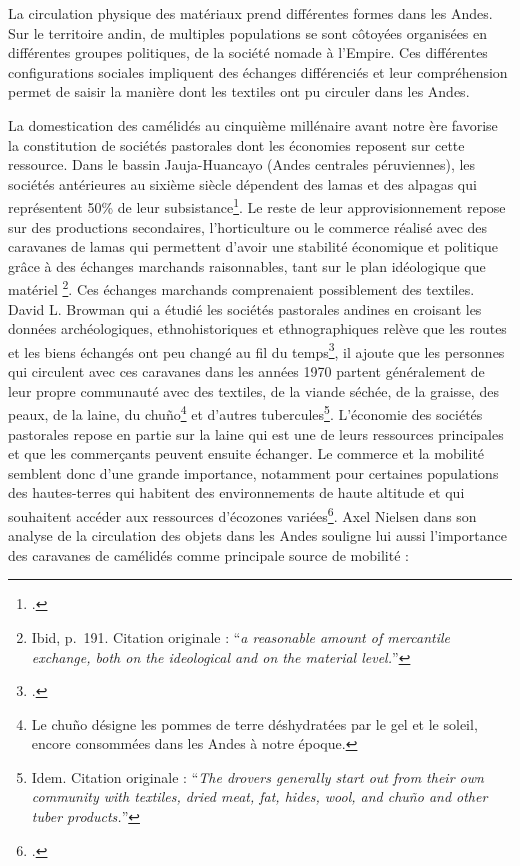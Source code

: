 La circulation physique des matériaux prend différentes formes dans les Andes. Sur le territoire andin, de multiples populations se sont côtoyées organisées en différentes groupes politiques, de la société nomade à l'Empire. Ces différentes configurations sociales impliquent des échanges différenciés et leur compréhension permet de saisir la manière dont les textiles ont pu circuler dans les Andes.

La domestication des camélidés au cinquième millénaire avant notre ère favorise la constitution de sociétés pastorales dont les économies reposent sur cette ressource. Dans le bassin Jauja-Huancayo (Andes centrales péruviennes), les sociétés antérieures au sixième siècle dépendent des lamas et des alpagas qui représentent 50\% de leur subsistance\footcite[p.~188]{browmanPastoralNomadismAndes1974}. 
Le reste de leur approvisionnement repose sur des productions secondaires, l'horticulture ou le commerce réalisé avec des caravanes de lamas qui permettent d'avoir une stabilité économique et politique grâce à \og  des échanges marchands raisonnables, tant sur le plan idéologique que matériel \fg\footnote{Ibid, p.~191. Citation originale : \textquotedblleft \textit{a reasonable amount of mercantile exchange, both on the ideological and on the material level.}\textquotedblright}. Ces échanges marchands comprenaient possiblement des textiles. David L. Browman qui a étudié les sociétés pastorales andines en croisant les données archéologiques, ethnohistoriques et ethnographiques relève que les routes et les biens échangés ont peu changé au fil du temps\footcite[p.~195]{browmanPastoralNomadismAndes1974}, il ajoute que les personnes qui circulent avec ces caravanes dans les années 1970 \og partent généralement de leur propre communauté avec des textiles, de la viande séchée, de la graisse, des peaux, de la laine, du chuño\footnote{Le chuño désigne les pommes de terre déshydratées par le gel et le soleil, encore consommées dans les Andes à notre époque.} et d'autres tubercules\fg\footnote{Idem. Citation originale : \textquotedblleft \textit{The drovers generally start out from their own community with textiles, dried meat, fat, hides, wool, and chuño and other tuber products.}\textquotedblright}. 
L'économie des sociétés pastorales repose en partie sur la laine qui est une de leurs ressources principales et que les commerçants peuvent ensuite échanger. Le commerce et la mobilité semblent donc d'une grande importance, notamment pour certaines populations des hautes-terres qui habitent des environnements de haute altitude et qui souhaitent accéder aux ressources d'écozones variées\footcite[p.~389]{nielsenCirculatingObjectsConstitution2013}. Axel Nielsen dans son analyse de la circulation des objets dans les Andes souligne lui aussi l'importance des caravanes de camélidés comme principale source de mobilité :  
